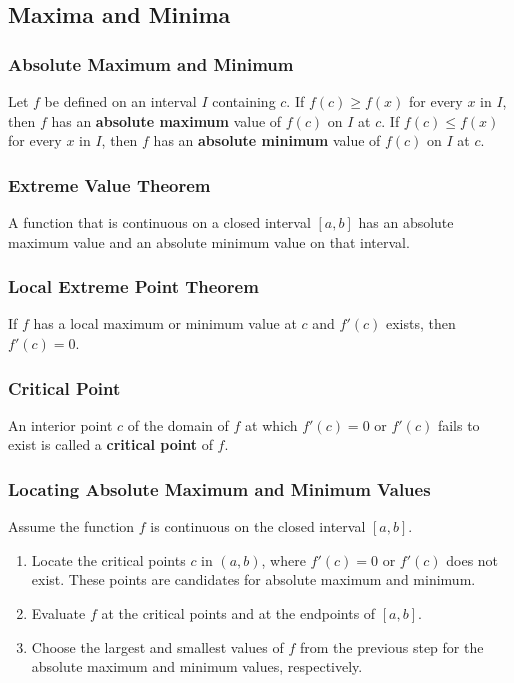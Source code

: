 %
%
%

\subsection{Maxima and Minima}
\subsubsection{Absolute Maximum and Minimum}
Let $f$ be defined on an interval $I$ containing $c$. If $f(c) \geq f(x)$ for every $x$ in $I$, then $f$ has an \textbf{absolute maximum} value of $f(c)$ on $I$ at $c$. If $f(c) \leq f(x)$ for every $x$ in $I$, then $f$ has an \textbf{absolute minimum} value of $f(c)$ on $I$ at $c$.

\subsubsection{Extreme Value Theorem}
A function that is continuous on a closed interval $[a, b]$ has an absolute maximum value and an absolute minimum value on that interval.

\subsubsection{Local Extreme Point Theorem}
If $f$ has a local maximum or minimum value at $c$ and $f'(c)$ exists, then $f'(c) = 0$.

\subsubsection{Critical Point}
An interior point $c$ of the domain of $f$ at which $f'(c) = 0$ or $f'(c)$ fails to exist is called a \textbf{critical point} of $f$.

\subsubsection{Locating Absolute Maximum and Minimum Values}
Assume the function $f$ is continuous on the closed interval $[a, b]$.

\begin{enumerate}
    \item Locate the critical points $c$ in $(a, b)$, where $f'(c) = 0$ or $f'(c)$ does not exist. These points are candidates for absolute maximum and minimum. 
    \item Evaluate $f$ at the critical points and at the endpoints of $[a, b]$.
    \item Choose the largest and smallest values of $f$ from the previous step for the absolute maximum and minimum values, respectively.
\end{enumerate}
